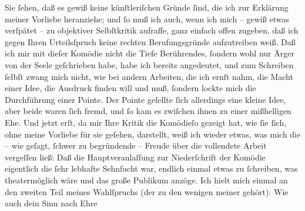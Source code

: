 \begin{ledgroupsized}[t]{13cm}
           \pstart
           Sie ſehen, daß es gewiß keine künſtleriſchen Gründe ſind, die ich zur Erklärung
               meiner Vorliebe heranziehe; und ſo muß ich auch, wenn {\pb}ich mich – gewiß etwas verſpätet – zu objektiver Selbſtkritik aufraffe, ganz
               einfach offen zugeben, daß ich gegen Ihren Urteilsſpruch keine rechten
               Berufungsgründe aufzutreiben weiß. Daß ich mir mit dieſer Komödie nicht die Tiefe
               Berührendes, ſondern wohl nur Ärger von der Seele geſchrieben habe, habe ich bereits
               angedeutet, und zum Schreiben ſelbſt zwang mich nicht, wie bei andern Arbeiten, die
               ich ernſt nahm, die Macht einer Idee, die Ausdruck finden will und muß, ſondern
               lockte mich die Durchführung einer Pointe. Der Pointe geſellte ſich allerdings eine
               kleine Idee, aber beide waren ſich fremd, und ſo kam es zwiſchen ihnen zu einer
               mißhelligen Ehe.\pend
           \pstart
           Und jetzt erſt, da mir Ihre Kritik die Komödieſo gezeigt hat, wie ſie ſich, ohne meine Vorliebe
               für sie geſehen, darstellt, weiß ich wieder etwas,
               was mich die – wie geſagt, ſchwer zu begründende – Freude über die vollendete Arbeit
               vergeſſen ließ: Daß die Hauptveranlaſſung zur Niederſchrift der Komödie eigentlich
               die ſehr lebhafte Sehnſucht war, endlich einmal etwas zu ſchreiben, was
               theatermöglich wäre und das große Publikum anzöge. Ich hielt mich einmal an den
               zweiten Teil meines Wahlſpruchs (der zu den wenigen meiner \label{K_L02215-1v}\label{K_L02215-1h} gehört):\pend
           \stanza{}{\pb}Wie auch dein Sinn nach Ehre

\end{ledgroupsized}
